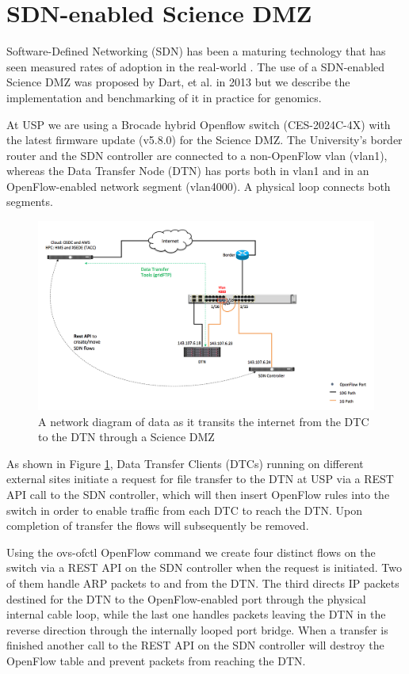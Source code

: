 \documentclass{sig-alternate-05-2015}
\begin{document}
\section{SDN-enabled Science DMZ}

Software-Defined Networking (SDN) has been a maturing technology that has seen measured rates of adoption in the real-world \cite{Kreutz2014}. The use of a SDN-enabled Science DMZ was proposed by Dart, et al. in 2013 but we describe the implementation and benchmarking of it in practice for genomics. 

At USP we are using a Brocade hybrid Openflow switch (CES-2024C-4X) with the latest firmware update (v5.8.0) for the Science DMZ. The University's border router and the SDN controller are connected to a non-OpenFlow vlan (vlan1), whereas the Data Transfer Node (DTN) has ports both in vlan1 and in an OpenFlow-enabled network segment (vlan4000). A physical loop connects both segments. 

\begin{figure}
\centering
\includegraphics[scale=0.15]{images/arch.png}
\caption{A network diagram of data as it transits the internet from the DTC to the DTN through a Science DMZ}
\label{fig:arch}
\end{figure}

As shown in Figure \ref{fig:arch}, Data Transfer Clients (DTCs) running on different external sites initiate a request for file transfer to the DTN at USP via a REST API call to the SDN controller, which will then insert OpenFlow rules into the switch in order to enable traffic from each DTC to reach the DTN. Upon completion of transfer the flows will subsequently be removed. 

Using the ovs-ofctl OpenFlow command we create four distinct flows on the switch via a REST API on the SDN controller when the request is initiated. Two of them handle ARP packets to and from the DTN. The third directs IP packets destined for the DTN to the OpenFlow-enabled port through the physical internal cable loop, while the last one handles packets leaving the DTN in the reverse direction through the internally looped port bridge. When a transfer is finished another call to the REST API on the SDN controller will destroy the OpenFlow table and prevent packets from reaching the DTN.
\end{document}
